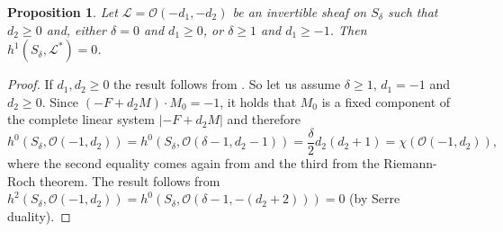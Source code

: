 \documentclass{amsart} %
\newtheorem{proposition}[theorem]{Proposition}
\theoremstyle{definition}
\newcommand{\cts}{\Theta_{S_{\delta}}}
\newcommand{\mcL}{\mathcal{L}}
\newcommand{\mcO}{\mathcal{O}}
\begin{document}
\begin{proposition}\label{lemma3}
 Let $\mcL=\mcO(-d_1,-d_2)$ be an invertible sheaf on $S_{\delta}$ such that
 $d_2\geq 0$ and, either $\delta=0$ and $d_1\geq 0$, or $\delta\geq 1$ and $d_1\geq -1$.
 Then $h^1(S_{\delta},\mcL^*)=0$.
\end{proposition}

\begin{proof}
 If $d_1,d_2\geq 0$ the result follows from \cite[Proposition 2.3]{Laface}. So let us assume
 $ \delta\geq 1 $, $d_1= -1$ and $d_2\geq 0$. Since $(-F+d_2M)\cdot M_0=-1$, it holds that $M_0$
 is a fixed component of the complete linear system $|-F+d_2M|$ and therefore
$$ h^0(S_{\delta},\mcO(-1,d_2))=h^0(S_{\delta},\mcO(\delta-1,d_2-1))
  =\frac{\delta}{2}d_2(d_2+1)=\chi(\mcO(-1,d_2)), $$
where the second equality comes again from \cite[Proposition 2.3]{Laface} and the third
from the Riemann-Roch theorem. The result follows from $ h^2(S_{\delta},\mcO(-1,d_2)) = h^0(S_{\delta},\mcO(\delta-1,-(d_2+2))) = 0 $
(by Serre duality).
\end{proof}
\end{document}
